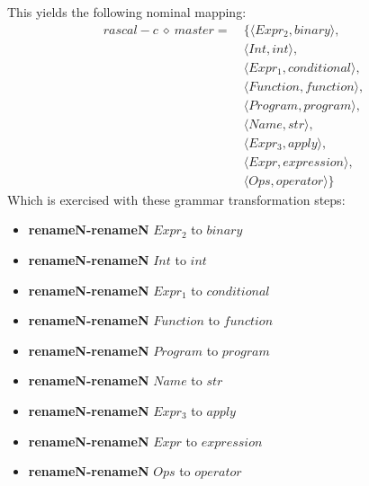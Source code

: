 This yields the following nominal mapping:
\begin{align*}\mathit{rascal-c} \:\diamond\: \mathit{master} =\:& \{\langle \mathit{Expr_2},\mathit{binary}\rangle,\\
 & \langle \mathit{Int},int\rangle,\\
 & \langle \mathit{Expr_1},\mathit{conditional}\rangle,\\
 & \langle \mathit{Function},\mathit{function}\rangle,\\
 & \langle \mathit{Program},\mathit{program}\rangle,\\
 & \langle \mathit{Name},str\rangle,\\
 & \langle \mathit{Expr_3},\mathit{apply}\rangle,\\
 & \langle \mathit{Expr},\mathit{expression}\rangle,\\
 & \langle \mathit{Ops},\mathit{operator}\rangle\}\end{align*}
 Which is exercised with these grammar transformation steps:

{\footnotesize\begin{itemize}
\item \textbf{renameN-renameN} $\mathit{Expr_2}$ to $\mathit{binary}$
\item \textbf{renameN-renameN} $\mathit{Int}$ to $int$
\item \textbf{renameN-renameN} $\mathit{Expr_1}$ to $\mathit{conditional}$
\item \textbf{renameN-renameN} $\mathit{Function}$ to $\mathit{function}$
\item \textbf{renameN-renameN} $\mathit{Program}$ to $\mathit{program}$
\item \textbf{renameN-renameN} $\mathit{Name}$ to $str$
\item \textbf{renameN-renameN} $\mathit{Expr_3}$ to $\mathit{apply}$
\item \textbf{renameN-renameN} $\mathit{Expr}$ to $\mathit{expression}$
\item \textbf{renameN-renameN} $\mathit{Ops}$ to $\mathit{operator}$
\end{itemize}}


